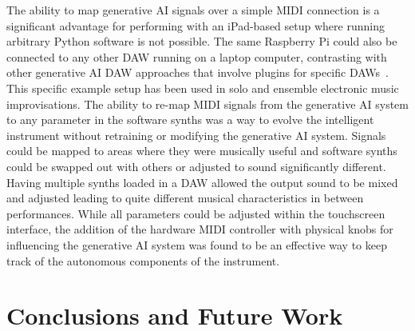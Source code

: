 \documentclass[manuscript,review,anonymous]{acmart}
\begin{document}
The ability to map generative AI signals over a simple MIDI connection is a  significant advantage for performing with an iPad-based setup where running arbitrary Python software is not possible. The same Raspberry Pi could also be connected to any other DAW running on a laptop computer, contrasting with other generative AI DAW approaches that involve plugins for specific DAWs~\cite{magenta-studio-2019}. 
This specific example setup has been used in solo and ensemble electronic music improvisations.
The ability to re-map MIDI signals from the generative AI system to any parameter in the software synths was a way to evolve the intelligent instrument without retraining or modifying the generative AI system. 
Signals could be mapped to areas where they were musically useful and software synths could be swapped out with others or adjusted to sound significantly different. 
Having multiple synths loaded in a DAW allowed the output sound to be mixed and adjusted leading to quite different musical characteristics in between performances.
While all parameters could be adjusted within the touchscreen interface, the addition of the hardware MIDI controller with physical knobs for influencing the generative AI system was found to be an effective way to keep track of the autonomous components of the instrument.

\section{Conclusions and Future Work}\label{conclusions}


\end{document}
